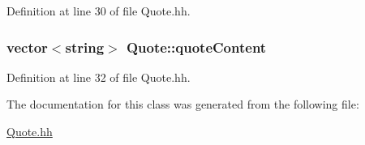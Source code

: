 Definition at line 30 of file Quote.\+hh.

\hypertarget{class_quote_a0ffcb584920e14d7dd5c45820997f989}{
\subsubsection[{quote\+Content}]{\setlength{\rightskip}{0pt plus 5cm}vector$<$string$>$ Quote\+::quote\+Content\hspace{0.3cm}{\ttfamily [private]}}}\label{class_quote_a0ffcb584920e14d7dd5c45820997f989}


Definition at line 32 of file Quote.\+hh.



The documentation for this class was generated from the following file\+:\begin{DoxyCompactItemize}
\item 
\hyperlink{_quote_8hh}{Quote.\+hh}\end{DoxyCompactItemize}
